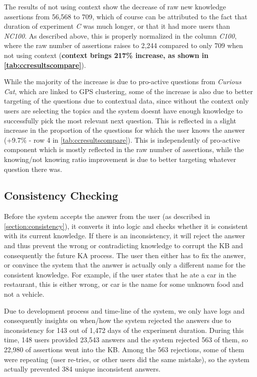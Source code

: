 {The results of not using context show the decrease of raw new knowledge 
assertions from 56,568 to 709, which of course can be attributed to the fact 
that duration of experiment \emph{C} was much longer, or that it had more users
than \emph{NC100}. As described above, this is properly normalized in the 
column \emph{C100}, where the raw number of assertions raises to 2,244 
compared to only 709 when not using context (\textbf{context brings 217\% 
increase, as shown in \autoref{tab:ccresultscompare}}).

While the majority of the increase is due to pro-active questions from 
\emph{Curious Cat}, which are linked to GPS clustering, some of the increase 
is also due to better targeting of the questions due to contextual data, 
since without the context only users are selecting the topics and the system 
doesnt have enough knowledge to successfully pick the most relevant next 
question. This is reflected in a slight increase in the proportion of the 
questions for which the user knows the answer (+9.7\% - row 4 in 
\autoref{tab:ccresultscompare}). This is independently of pro-active component 
which is mostly reflected in the raw number of assertions, while the 
knowing/not knowing ratio improvement is due to better targeting whatever 
question there was.

\subsection{Consistency Checking}
\label{section:resultsConsistencyChecking}
Before the system accepts the answer from the user (as described in 
\autoref{section:consistency}), it converts it into logic and checks whether it 
is consistent with its current knowledge. If there is an inconsistency, it will 
reject the answer and thus prevent the wrong or contradicting knowledge to 
corrupt the KB and consequently the future KA process. The user then either has
to fix the answer, or convince the system that the answer is actually only a 
different name for the consistent knowledge. For example, if the user states 
that he ate a car in the restaurant, this is either wrong, or car is the name 
for some unknown food and not a vehicle.

Due to development process and time-line of the system, we only have logs and 
consequently insights on when/how the system rejected the answers due to 
inconsistency for 143 out of 1,472 days of the experiment duration. During 
this time, 148 users provided 23,543 answers and the system rejected 563 of 
them, so 22,980 of assertions went into the KB. Among the 563 rejections, 
some of them were repeating (user re-tries, or other users did the same 
mistake), so the system actually prevented 384 unique inconsistent answers.

}
